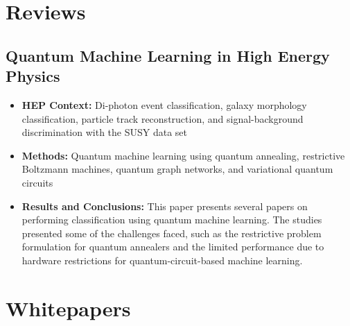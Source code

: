 \section{Reviews}

\subsection{Quantum Machine Learning in High Energy Physics~\cite{Guan:2020bdl}}
\begin{itemize}
	\item \textbf{HEP Context: }Di-photon event classification, galaxy morphology classification, particle track reconstruction, and signal-background discrimination with the SUSY data set
	\item \textbf{Methods: }Quantum machine learning using quantum annealing, restrictive Boltzmann machines, quantum graph networks, and variational quantum circuits
	\item \textbf{Results and Conclusions: }This paper presents several papers on performing classification using quantum machine learning. The studies presented some of the challenges faced, such as the restrictive problem formulation for quantum annealers and the limited performance due to hardware restrictions for quantum-circuit-based machine learning.
\end{itemize}

\section{Whitepapers}

